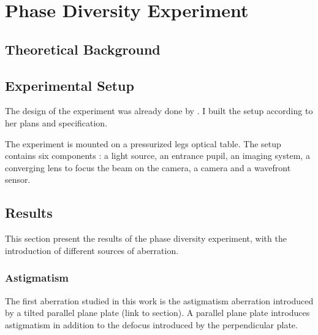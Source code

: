 
\chapter{Phase Diversity Experiment} %

\label{PDExp} %




\section{Theoretical Background}




\section{Experimental Setup}

The design of the experiment was already done by \citet{Bouxin_PDM}. I built the setup according to her plans and specification.

The experiment is mounted on a pressurized legs optical table. The setup contains six components : a light source, an entrance pupil, an imaging system, a converging lens to focus the beam on the camera, a camera and a wavefront sensor.


\section{Results}

This section present the results of the phase diversity experiment, with the introduction of different sources of aberration.

\subsection{Astigmatism}

The first aberration studied in this work is the astigmatism aberration introduced by a tilted parallel plane plate (link to section). A parallel plane plate introduces astigmatism in addition to the defocus introduced by the perpendicular plate.

